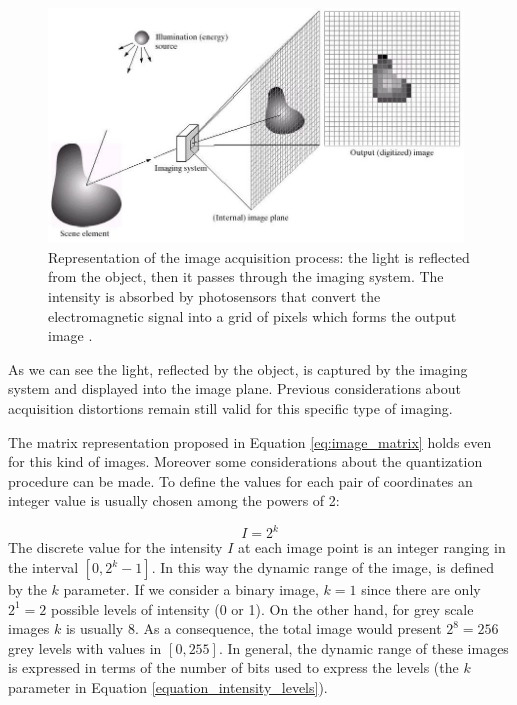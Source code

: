 \documentclass[../main.tex]{subfiles}
\begin{document}
\begin{figure}[H] 
\begin{center}
\includegraphics[width=11cm]{images/Image-Acquisition-Model.png}
\caption{\small{Representation of the image acquisition process: the light is reflected from the object, then it passes through the imaging system. The intensity is absorbed by photosensors that convert the electromagnetic signal into a grid of pixels which forms the output image \cite{CNN_chapter13}.}}\label{fig:Image_acquisition}
\end{center}
\end{figure}

As we can see the light, reflected by the object, is captured by the imaging system and displayed into the image plane. Previous considerations about acquisition distortions remain still valid for this specific type of imaging.


The matrix representation proposed in Equation \ref{eq:image_matrix} holds even for this kind of images. Moreover some considerations about the quantization procedure can be made. 
To define the values for each pair of coordinates an integer value is usually chosen among the powers of 2:

\begin{equation}\label{equation_intensity_levels}
    I = 2^{k}
\end{equation}
The discrete value for the intensity $I$ at each image point is an integer ranging in the interval $[0,2^{k}-1]$. 
In this way the dynamic range of the image, is defined by the $k$ parameter. 
If we consider a binary image, $k=1$ since there are only $2^{1}=2$ possible levels of intensity (0 or 1).
On the other hand, for grey scale images $k$ is usually 8. As a consequence, the total image would present $2^{8}=256$ grey levels with values in $[0,255]$.
In general, the dynamic range of these images is expressed in terms of the number of bits used to express the levels (the $k$ parameter in Equation \ref{equation_intensity_levels}).
\end{document}
